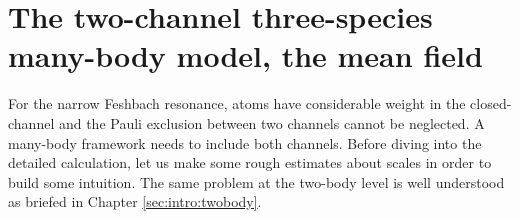 


\newcommand{\htd}{\tilde{h}}
\chapter{The two-channel three-species many-body model, the mean field\label{ch:path2}}


For the narrow Feshbach resonance, atoms have considerable weight in the closed-channel and the Pauli exclusion between two channels cannot be neglected.  A many-body framework needs to include both channels.  Before diving into the detailed calculation, let us make some rough estimates about scales in order to  build some intuition.  The same problem at the two-body level is well understood as briefed in Chapter \ref{sec:intro:twobody}.  %
